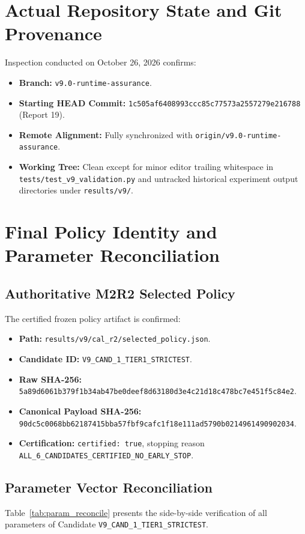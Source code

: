 \documentclass[10pt,a4paper]{article}
\begin{document}
\section{Actual Repository State and Git Provenance}
Inspection conducted on October 26, 2026 confirms:
\begin{itemize}
    \item \textbf{Branch:} \texttt{v9.0-runtime-assurance}.
    \item \textbf{Starting HEAD Commit:} \texttt{1c505af6408993ccc85c77573a2557279e216788} (Report 19).
    \item \textbf{Remote Alignment:} Fully synchronized with \texttt{origin/v9.0-runtime-assurance}.
    \item \textbf{Working Tree:} Clean except for minor editor trailing whitespace in \texttt{tests/test\_v9\_validation.py} and untracked historical experiment output directories under \texttt{results/v9/}.
\end{itemize}

\section{Final Policy Identity and Parameter Reconciliation}

\subsection{Authoritative M2R2 Selected Policy}
The certified frozen policy artifact is confirmed:
\begin{itemize}
    \item \textbf{Path:} \texttt{results/v9/cal\_r2/selected\_policy.json}.
    \item \textbf{Candidate ID:} \texttt{V9\_CAND\_1\_TIER1\_STRICTEST}.
    \item \textbf{Raw SHA-256:} \texttt{5a89d6061b379f1b34ab47be0deef8d63180d3e4c21d18c478bc7e451f5c84e2}.
    \item \textbf{Canonical Payload SHA-256:} \texttt{90dc5c0068bb62187415bba57fbf9cafc1f18e111ad5790b0214961490902034}.
    \item \textbf{Certification:} \texttt{certified: true}, stopping reason \texttt{ALL\_6\_CANDIDATES\_CERTIFIED\_NO\_EARLY\_STOP}.
\end{itemize}

\subsection{Parameter Vector Reconciliation}
Table~\ref{tab:param_reconcile} presents the side-by-side verification of all parameters of Candidate \texttt{V9\_CAND\_1\_TIER1\_STRICTEST}.
\end{document}

